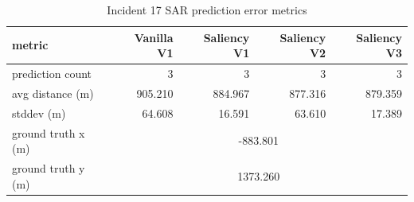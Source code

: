 \begin{table}[ht]
\centering
\caption{Incident 17 SAR prediction error metrics}
\label{tab:sar-incident-17}
\begin{tabular}{lrrrr}
\hline
metric & Vanilla V1 & Saliency V1 & Saliency V2 & Saliency V3 \\
\hline
prediction count & 3 & 3 & 3 & 3 \\
avg distance (m) & 905.210 & 884.967 & 877.316 & 879.359 \\
stddev (m) & 64.608 & 16.591 & 63.610 & 17.389 \\
ground truth x (m) & \multicolumn{4}{c}{-883.801} \\
ground truth y (m) & \multicolumn{4}{c}{1373.260} \\
\hline
\end{tabular}
\end{table}
